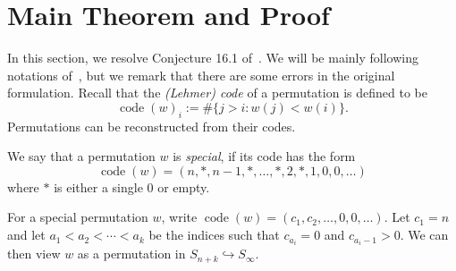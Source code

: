 \documentclass[ALCO,ThmDefs,Unicode,epreuves]{cedram}
\DeclareMathOperator{\code}{code}
\begin{document}
\section{Main Theorem and Proof}\label{sec:main}
In this section, we resolve Conjecture 16.1 of~\cite{postnikov2009chains}. We will be mainly following notations of~\cite{postnikov2009chains}, but we remark that there are some errors in the original formulation. Recall that the \emph{(Lehmer) code} of a permutation is defined to be
\[
\code(w)_i:=\#\{j>i:w(j)<w(i)\}.
\]
Permutations can be reconstructed from their codes.
\begin{defi}
We say that a permutation $w$ is \emph{special}, if its code has the form
\[
\code(w)=(n,*,n-1,*,\ldots,*,2,*,1,0,0,\ldots)
\]
where $*$ is either a single 0 or empty.
\end{defi}
For a special permutation $w$, write $\code(w)=(c_1,c_2,\ldots,0,0,\ldots)$. Let $c_1=n$ and let $a_1<a_2<\cdots<a_k$ be the indices such that $c_{a_i}=0$ and $c_{a_i-1}>0$. We can then view $w$ as a permutation in $S_{n+k}\hookrightarrow S_{\infty}$. 
\end{document}

